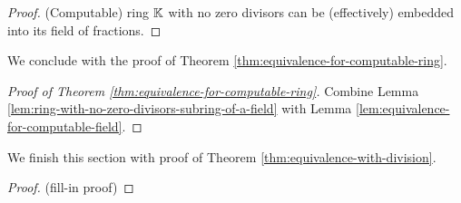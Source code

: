 \begin{proof}
	(Computable) ring ${\mathbb K}$ with no zero divisors can be (effectively) embedded into its field of fractions.
\end{proof}
We conclude with the proof of Theorem \ref{thm:equivalence-for-computable-ring}.
\begin{proof}[Proof of Theorem \ref{thm:equivalence-for-computable-ring}]
	Combine Lemma \ref{lem:ring-with-no-zero-divisors-subring-of-a-field} with Lemma \ref{lem:equivalence-for-computable-field}.
\end{proof}
We finish this section with proof of Theorem \ref{thm:equivalence-with-division}.
\thmequivalenceWithDivision*
\begin{proof}
(fill-in proof)
\end{proof}
